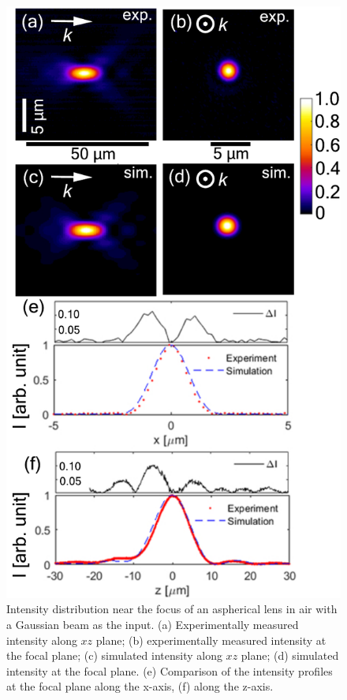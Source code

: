 \documentclass[9pt,twocolumn,twoside]{osajnl}
\begin{document}
\begin{figure}
	\centering
	\includegraphics[width=\linewidth]{C240TME-C.pdf}
	\caption{Intensity distribution near the focus of an aspherical lens in air with a Gaussian beam as the input. (a) Experimentally measured intensity along $xz$ plane; (b) experimentally measured intensity at the focal plane; (c) simulated intensity along $xz$ plane; (d) simulated intensity at the focal plane. (e) Comparison of the intensity profiles at the focal plane along the x-axis, (f) along the z-axis.}\label{fig:3b}
\end{figure}
\end{document}
